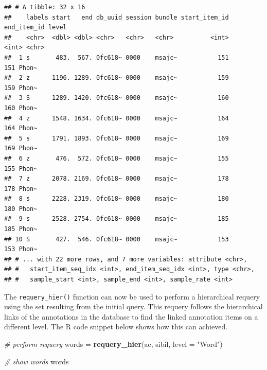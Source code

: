 \documentclass[]{book}
\newenvironment{Shaded}{\begin{snugshade}}{\end{snugshade}}
\newcommand{\CommentTok}[1]{\textcolor[rgb]{0.56,0.35,0.01}{\textit{#1}}}
\newcommand{\DataTypeTok}[1]{\textcolor[rgb]{0.13,0.29,0.53}{#1}}
\newcommand{\KeywordTok}[1]{\textcolor[rgb]{0.13,0.29,0.53}{\textbf{#1}}}
\newcommand{\NormalTok}[1]{#1}
\newcommand{\StringTok}[1]{\textcolor[rgb]{0.31,0.60,0.02}{#1}}
\begin{document}
\begin{verbatim}
## # A tibble: 32 x 16
##    labels start   end db_uuid session bundle start_item_id end_item_id level
##    <chr>  <dbl> <dbl> <chr>   <chr>   <chr>          <int>       <int> <chr>
##  1 s       483.  567. 0fc618~ 0000    msajc~           151         151 Phon~
##  2 z      1196. 1289. 0fc618~ 0000    msajc~           159         159 Phon~
##  3 S      1289. 1420. 0fc618~ 0000    msajc~           160         160 Phon~
##  4 z      1548. 1634. 0fc618~ 0000    msajc~           164         164 Phon~
##  5 s      1791. 1893. 0fc618~ 0000    msajc~           169         169 Phon~
##  6 z       476.  572. 0fc618~ 0000    msajc~           155         155 Phon~
##  7 z      2078. 2169. 0fc618~ 0000    msajc~           178         178 Phon~
##  8 s      2228. 2319. 0fc618~ 0000    msajc~           180         180 Phon~
##  9 s      2528. 2754. 0fc618~ 0000    msajc~           185         185 Phon~
## 10 S       427.  546. 0fc618~ 0000    msajc~           153         153 Phon~
## # ... with 22 more rows, and 7 more variables: attribute <chr>,
## #   start_item_seq_idx <int>, end_item_seq_idx <int>, type <chr>,
## #   sample_start <int>, sample_end <int>, sample_rate <int>
\end{verbatim}

The \texttt{requery\_hier()} function can now be used to perform a hierarchical requery using the set resulting from the initial query. This requery follows the hierarchical links of the annotations in the database to find the linked annotation items on a different level. The R code snippet below shows how this can achieved.

\begin{Shaded}
\begin{Highlighting}[]
\CommentTok{# perform requery}
\NormalTok{words =}\StringTok{ }\KeywordTok{requery_hier}\NormalTok{(ae, sibil, }\DataTypeTok{level =} \StringTok{"Word"}\NormalTok{)}

\CommentTok{# show words}
\NormalTok{words}
\end{Highlighting}
\end{Shaded}
\end{document}
